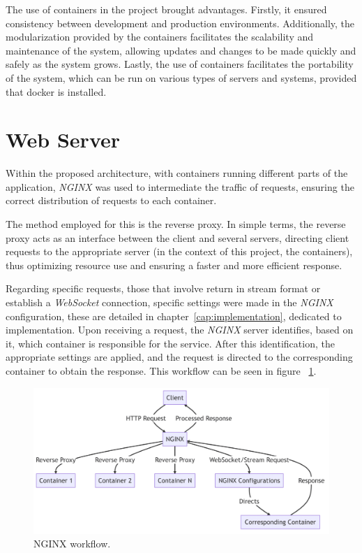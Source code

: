 The use of containers in the project brought advantages. Firstly, it ensured consistency between development and production environments. Additionally, the modularization provided by the containers facilitates the scalability and maintenance of the system, allowing updates and changes to be made quickly and safely as the system grows. Lastly, the use of containers facilitates the portability of the system, which can be run on various types of servers and systems, provided that docker is installed.


\section{Web Server}\label{sec:webserver}

Within the proposed architecture, with containers running different parts of the application, \textit{NGINX} \cite{nginxDocs} was used to intermediate the traffic of requests, ensuring the correct distribution of requests to each container.

The method employed for this is the reverse proxy. In simple terms, the reverse proxy acts as an interface between the client and several servers, directing client requests to the appropriate server (in the context of this project, the containers), thus optimizing resource use and ensuring a faster and more efficient response.

Regarding specific requests, those that involve return in stream format or establish a \textit{WebSocket} connection, specific settings were made in the \textit{NGINX} configuration, these are detailed in chapter~\ref{cap:implementation}, dedicated to implementation. Upon receiving a request, the \textit{NGINX} server identifies, based on it, which container is responsible for the service. After this identification, the appropriate settings are applied, and the request is directed to the corresponding container to obtain the response. This workflow can be seen in figure ~\ref{fig:nginx_workflow}.

\begin{figure}[htbp]
	\centering
	\includegraphics[scale=0.2]{images/diagrama_nginx.png}
	\caption{NGINX workflow.}
	\label{fig:nginx_workflow}
\end{figure}

